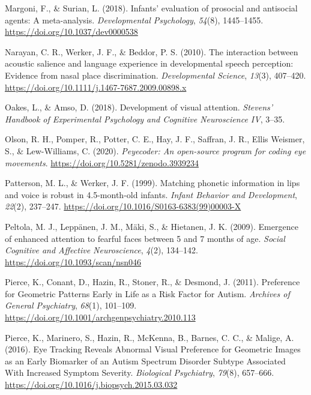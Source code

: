 \documentclass[
  english,
  man,floatsintext]{apa6}
\newlength{\cslhangindent}
\newenvironment{CSLReferences}[2] %
 {\begin{list}{}{%
  \setlength{\itemindent}{0pt}
  \setlength{\leftmargin}{0pt}
  \setlength{\parsep}{0pt}
  \ifodd #1
   \setlength{\leftmargin}{\cslhangindent}
   \setlength{\itemindent}{-1\cslhangindent}
  \fi
  \setlength{\itemsep}{#2\baselineskip}}}
 {\end{list}}
\begin{document}
\begin{CSLReferences}{1}{0}
Margoni, F., \& Surian, L. (2018). Infants' evaluation of prosocial and antisocial agents: {A} meta-analysis. \emph{Developmental Psychology}, \emph{54}(8), 1445--1455. \url{https://doi.org/10.1037/dev0000538}

Narayan, C. R., Werker, J. F., \& Beddor, P. S. (2010). The interaction between acoustic salience and language experience in developmental speech perception: Evidence from nasal place discrimination. \emph{Developmental Science}, \emph{13}(3), 407--420. \url{https://doi.org/10.1111/j.1467-7687.2009.00898.x}

Oakes, L., \& Amso, D. (2018). Development of visual attention. \emph{Stevens' Handbook of Experimental Psychology and Cognitive Neuroscience IV}, 3--35.

Olson, R. H., Pomper, R., Potter, C. E., Hay, J. F., Saffran, J. R., Ellis Weismer, S., \& Lew-Williams, C. (2020). \emph{Peyecoder: {An} open-source program for coding eye movements}. \url{https://doi.org/10.5281/zenodo.3939234}

Patterson, M. L., \& Werker, J. F. (1999). Matching phonetic information in lips and voice is robust in 4.5-month-old infants. \emph{Infant Behavior and Development}, \emph{22}(2), 237--247. \url{https://doi.org/10.1016/S0163-6383(99)00003-X}

Peltola, M. J., Leppänen, J. M., Mäki, S., \& Hietanen, J. K. (2009). Emergence of enhanced attention to fearful faces between 5 and 7 months of age. \emph{Social Cognitive and Affective Neuroscience}, \emph{4}(2), 134--142. \url{https://doi.org/10.1093/scan/nsn046}

Pierce, K., Conant, D., Hazin, R., Stoner, R., \& Desmond, J. (2011). Preference for {Geometric Patterns Early} in {Life} as a {Risk Factor} for {Autism}. \emph{Archives of General Psychiatry}, \emph{68}(1), 101--109. \url{https://doi.org/10.1001/archgenpsychiatry.2010.113}

Pierce, K., Marinero, S., Hazin, R., McKenna, B., Barnes, C. C., \& Malige, A. (2016). Eye {Tracking Reveals Abnormal Visual Preference} for {Geometric Images} as an {Early Biomarker} of an {Autism Spectrum Disorder Subtype Associated With Increased Symptom Severity}. \emph{Biological Psychiatry}, \emph{79}(8), 657--666. \url{https://doi.org/10.1016/j.biopsych.2015.03.032}


\end{CSLReferences}
\end{document}
